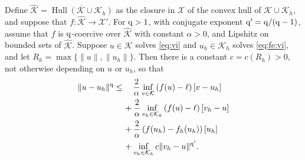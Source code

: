 \documentclass[hidelinks,onefignum,onetabnum,final]{siamart220329}  %
\newcommand{\cK}{\mathcal{K}}
\newcommand{\cX}{\mathcal{X}}
\newcommand{\hcK}{\widehat{\cK}}
\newcommand{\qq}{{\text{\textnormal{q}}}}
\DeclareMathOperator*{\Hull}{Hull}
\begin{document}
\begin{theorem} \label{thm:abstractestimate}  Define $\hcK = \overline{\Hull{(\cK \cup \cK_h)}}$ as the closure in $\cX$ of the convex hull of $\cK \cup \cK_h$, and suppose that $f:\hcK \to \cX'$.  For $\qq>1$, with conjugate exponent $\qq'=\qq/(\qq-1)$, assume that $f$ is $\qq$-coercive over $\hcK$ with constant $\alpha>0$, and Lipshitz on bounded sets of $\hcK$.  Suppose $u\in\cK$ solves \eqref{eq:vi} and $u_h\in\cK_h$ solves \eqref{eq:fe:vi}, and let $R_h=\max\{\|u\|,\|u_h\|\}$.  Then there is a constant $c=c(R_h)>0$, not otherwise depending on $u$ or $u_h$, so that
\begin{align}
\|u-u_h\|^\qq &\le \quad \frac{2}{\alpha} \inf_{v\in\cK} \left(f(u)-\ell\right)[v-u_h] \label{eq:abstractestimate} \\
   &\quad\, + \frac{2}{\alpha} \inf_{v_h\in\cK_h} \left(f(u)-\ell\right)[v_h-u] \notag \\
   &\quad\, + \frac{2}{\alpha} \left(f(u_h)-f_h(u_h)\right)[u_h] \notag \\
   &\quad\, + \inf_{v_h\in\cK_h} c \|v_h - u\|^{\qq'}. \notag
\end{align}
\end{theorem}
\end{document}
